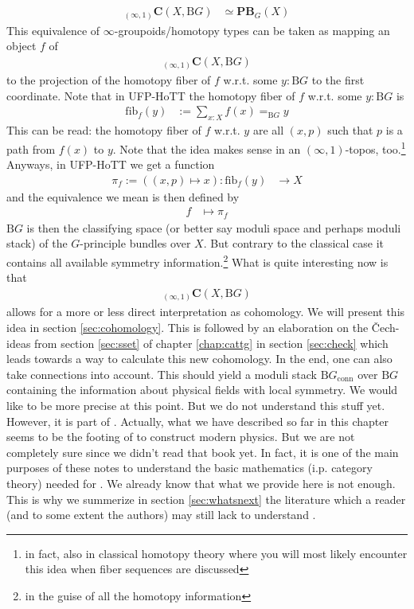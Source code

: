 \begin{align*}
  {}_{(\infty,1)}\mathbf{C}
  \left(
    X,
    \mathrm{B}G
  \right)
  &\simeq
  \mathbf{PB}_{G}(X)
\end{align*}
This equivalence of $\infty$-groupoids/homotopy types can be taken as mapping an object $f$ of
\begin{align*}
  {}_{(\infty,1)}\mathbf{C}
  \left(
    X,
    \mathrm{B}G
  \right)
\end{align*}
to the projection of the homotopy fiber of $f$ w.r.t. some $y \colon \mathrm{B}G$ to the first coordinate. Note that in UFP-HoTT the homotopy fiber of $f$ w.r.t. some $y \colon \mathrm{B}G$ is
\begin{align*}
  \mathrm{fib}_{f}(y)
  &:=
  \sum_{x \colon X}
  f(x)
  =_{\mathrm{B}G}
  y
\end{align*}
This can be read: the homotopy fiber of $f$ w.r.t. $y$ are all $(x,p)$ such that $p$ is a path from $f(x)$ to $y$. Note that the idea makes sense in an $(\infty,1)$-topos, too.\footnote{in fact, also in classical homotopy theory where you will most likely encounter this idea when fiber sequences are discussed} Anyways, in UFP-HoTT we get a function
\begin{align*}
  \pi_{f}
  :=
  \left(
    (x,p)
    \mapsto
    x
  \right)
  \colon
  \mathrm{fib}_{f}(y)
  &\rightarrow
  X
\end{align*}
and the equivalence we mean is then defined by
\begin{align*}
  f
  &\mapsto
  \pi_{f}
\end{align*}
$\mathrm{B}G$ is then the classifying space (or better say moduli space and perhaps moduli stack) of the $G$-principle bundles over $X$. But contrary to the classical case it contains all available symmetry information.\footnote{in the guise of all the homotopy information} What is quite interesting now is that
\begin{align*}
  {}_{(\infty,1)}\mathbf{C}
  \left(
    X,
    \mathrm{B}G
  \right)
\end{align*}
allows for a more or less direct interpretation as cohomology. We will present this idea in section \ref{sec:cohomology}. This is followed by an elaboration on the {\glqq}\v{C}ech-ideas{\grqq} from section \ref{sec:sset} of chapter \ref{chap:cattg} in section \ref{sec:check} which leads towards a way to {\glqq}calculate{\grqq} this new cohomology. In the end, one can also take connections into account. This should yield a moduli stack $\mathrm{B}G_{\textrm{conn}}$ {\glqq}over{\grqq} $\mathrm{B}G$ containing the information about physical fields with local symmetry. We would like to be more precise at this point. But we do not understand this stuff yet. However, it is part of \cite{a565d200}. Actually, what we have described so far in this chapter seems to be the footing of \cite{a565d200} to construct modern physics. But we are not completely sure since we didn't read that book yet. In fact, it is one of the main purposes of these notes to understand the basic mathematics (i.p. category theory) needed for \cite{a565d200}. We already know that what we provide here is not enough. This is why we summerize in section \ref{sec:whatsnext} the literature which a reader (and to some extent the authors) may still lack to understand \cite{a565d200}.

